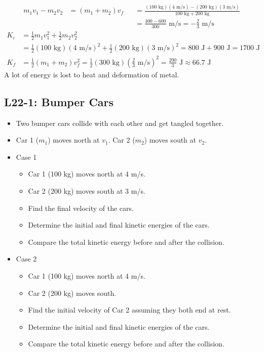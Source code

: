 \documentclass[]{article}
\newcommand{\Week}{22}
\begin{document}
\begin{TeacherMargin}
\begin{align*}
	m_{1}v_{1} - m_{2}v_{2} & = (m_{1}+m_{2})v_{f} &  & = \frac{(100\text{ kg})(4\text{ m/s})-(200\text{ kg})(3\text{ m/s})}{100\text{ kg}+200\text{ kg}} \\
	& & & = \frac{400-600}{300}\text{ m/s} = -\frac{2}{3}\text{ m/s}
\end{align*}
\begin{align*}
	K_{i} & = \frac{1}{2}m_{1}v_{1}^{2} + \frac{1}{2}m_{2}v_{2}^{2} \\
	& = \frac{1}{2}(100\text{ kg})(4\text{ m/s})^{2} + \frac{1}{2}(200\text{ kg})(3\text{ m/s})^{2} = 800\text{ J} + 900\text{ J} = 1700\text{ J} \\
	K_{f} & = \frac{1}{2}(m_{1}+m_{2})v_{f}^{2} = \frac{1}{2}(300\text{ kg})\left(\frac{2}{3}\text{ m/s}\right)^{2} = \frac{200}{3}\text{ J} \approx 66.7\text{ J}
\end{align*}
A lot of energy is lost to heat and deformation of metal.
\end{TeacherMargin}
\begin{PresentSpace}
\vspace{-10pt}
\section*{L\Week-1: Bumper Cars}
\vspace{-10pt}
\begin{itemize}
	\item Two bumper cars collide with each other and get tangled together.
	\item Car 1 ($m_{1}$) moves north at $v_{1}$. Car 2 ($m_{2}$) moves south at $v_{2}$.
\end{itemize}
\begin{multicols}{2}
	\begin{itemize}
		\item Case 1
		\begin{itemize}
			\large
			\item Car 1 (100 kg) moves north at 4 m/s.
			\item Car 2 (200 kg) moves south at 3 m/s.
			\item Find the final velocity of the cars.
			\item Determine the initial and final kinetic energies of the cars.
			\item Compare the total kinetic energy before and after the collision.
		\end{itemize}
		\item Case 2
		\begin{itemize}
			\large
			\item Car 1 (100 kg) moves north at 4 m/s.
			\item Car 2 (200 kg) moves south.
			\item Find the initial velocity of Car 2 assuming they both end at rest.
			\item Determine the initial and final kinetic energies of the cars.
			\item Compare the total kinetic energy before and after the collision.
		\end{itemize}
	\end{itemize}
\end{multicols}
\end{PresentSpace}
\end{document}
